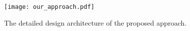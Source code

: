 
\begin{figure}[htbp]
\centering
\texttt{[image: our\_approach.pdf]}
    \caption{The detailed design architecture of the proposed approach.}
    \label{fig-design}
\end{figure}